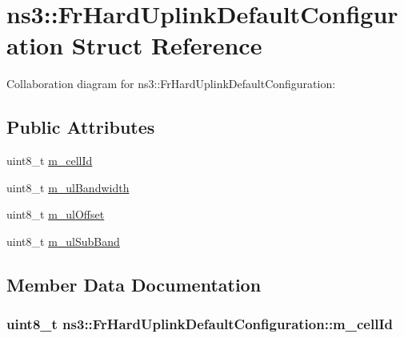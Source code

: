 \hypertarget{structns3_1_1FrHardUplinkDefaultConfiguration}{}\section{ns3\+:\+:Fr\+Hard\+Uplink\+Default\+Configuration Struct Reference}
\label{structns3_1_1FrHardUplinkDefaultConfiguration}


Collaboration diagram for ns3\+:\+:Fr\+Hard\+Uplink\+Default\+Configuration\+:
\subsection*{Public Attributes}
\begin{DoxyCompactItemize}
\item 
uint8\+\_\+t \hyperlink{structns3_1_1FrHardUplinkDefaultConfiguration_a2adc26f6447e4ad34063f5fac56ea3f8}{m\+\_\+cell\+Id}
\item 
uint8\+\_\+t \hyperlink{structns3_1_1FrHardUplinkDefaultConfiguration_a6559b272098c06d135a52b0565567b17}{m\+\_\+ul\+Bandwidth}
\item 
uint8\+\_\+t \hyperlink{structns3_1_1FrHardUplinkDefaultConfiguration_aa974511f8dafa96fa1dd406f4e6ea531}{m\+\_\+ul\+Offset}
\item 
uint8\+\_\+t \hyperlink{structns3_1_1FrHardUplinkDefaultConfiguration_a70dc0aa992c216181d96488a9ed1d93a}{m\+\_\+ul\+Sub\+Band}
\end{DoxyCompactItemize}


\subsection{Member Data Documentation}
\subsubsection[{\texorpdfstring{m\+\_\+cell\+Id}{m_cellId}}]{\setlength{\rightskip}{0pt plus 5cm}uint8\+\_\+t ns3\+::\+Fr\+Hard\+Uplink\+Default\+Configuration\+::m\+\_\+cell\+Id}\hypertarget{structns3_1_1FrHardUplinkDefaultConfiguration_a2adc26f6447e4ad34063f5fac56ea3f8}{}\label{structns3_1_1FrHardUplinkDefaultConfiguration_a2adc26f6447e4ad34063f5fac56ea3f8}
